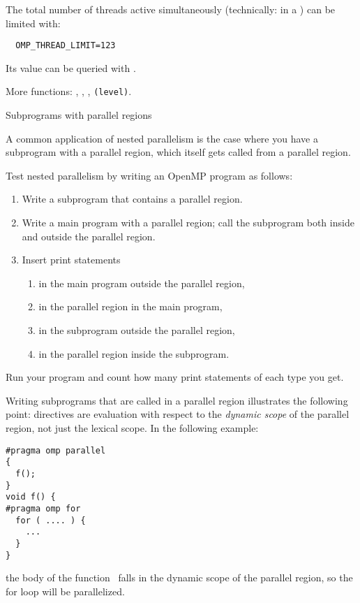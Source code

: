 The total number of threads active simultaneously
(technically: in a )
can be limited with:
\begin{verbatim}
  OMP_THREAD_LIMIT=123
\end{verbatim}
Its value can be queried with .

More functions: , ,
, \lstinline{(level)}.

 {Subprograms with parallel regions}

A common application of nested parallelism is the case
where you have a subprogram with a parallel region,
which itself gets called from a parallel region.

\begin{exercise}
  Test nested parallelism by writing an OpenMP program as follows:
  \begin{enumerate}
  \item Write a subprogram that contains a parallel region.
  \item\label{ex:nest:sub} Write a main program with a parallel region; call the subprogram both inside and outside the parallel region.
    \item Insert print statements 
      \begin{enumerate}
      \item in the main program outside the parallel region,
      \item in the parallel region in the main program,
      \item\label{ex:nest:sub:sub} in the subprogram outside the parallel region,
      \item in the parallel region inside the subprogram.
      \end{enumerate}
  \end{enumerate}
  Run your program and count how many print statements of each type you get.
\end{exercise}

Writing subprograms that are called in a parallel region illustrates
the following point: directives are evaluation with respect to the
\emph{dynamic scope} of the
parallel region, not just the lexical scope. In the following example:
\begin{lstlisting}
#pragma omp parallel
{
  f();
}
void f() {
#pragma omp for
  for ( .... ) {
    ...
  }
}
\end{lstlisting}
the body of the function~ falls in the dynamic scope of the
parallel region, so the for loop will be parallelized.

